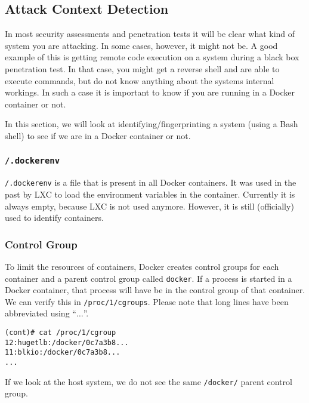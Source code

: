 \subsection{Attack Context Detection}
In most security assessments and penetration tests it will be clear what kind of system you are attacking. In some cases, however, it might not be. A good example of this is getting remote code execution on a system during a black box penetration test. In that case, you might get a reverse shell and are able to execute commands, but do not know anything about the systems internal workings. In such a case it is important to know if you are running in a Docker container or not.

In this section, we will look at identifying/fingerprinting a system (using a Bash shell) to see if we are in a Docker container or not.

\subsubsection{\texorpdfstring{\lstinline{/.dockerenv}}{/.dockerenv}}
\lstinline{/.dockerenv} is a file that is present in all Docker containers. It was used in the past by LXC to load the environment variables in the container. Currently it is always empty, because LXC is not used anymore. However, it is still (officially) used to identify containers\cite{Metasploit-Linux-Gather-Container-Detection}\cite{Removed-Dockerinit-Reference}.

\subsubsection{Control Group}
To limit the resources of containers, Docker creates control groups for each container and a parent control group called \lstinline{docker}. If a process is started in a Docker container, that process will have be in the control group of that container. We can verify this in \lstinline{/proc/1/cgroups}\cite{Metasploit-Linux-Gather-Container-Detection}. Please note that long lines have been abbreviated using ``$\ldots$''.

\begin{lstlisting}[caption={Process control group inside container},captionpos=b]
(cont)# cat /proc/1/cgroup
12:hugetlb:/docker/0c7a3b8...
11:blkio:/docker/0c7a3b8...
...
\end{lstlisting}

If we look at the host system, we do not see the same \lstinline{/docker/} parent control group.

